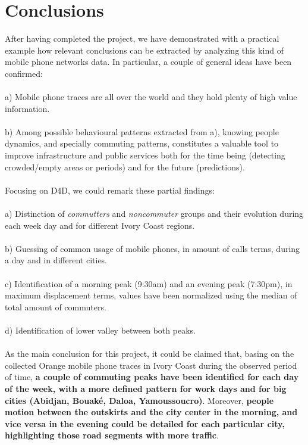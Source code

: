 \newpage
\section{Conclusions}

After having completed the project, we have demonstrated with a practical example how relevant conclusions can be extracted by analyzing this kind of mobile phone networks data. In particular, a couple of general ideas have been confirmed:
\\
\\
a) Mobile phone traces are all over the world and they hold plenty of high value information.
\\
\\
b) Among possible behavioural patterns extracted from a), knowing people dynamics, and specially commuting patterns, constitutes a valuable tool to improve infrastructure and public services both for the time being (detecting crowded/empty areas or periods) and for the future (predictions).
\\
\\
Focusing on D4D, we could remark these partial findings:
\\
\\
a) Distinction of {\it commutters} and {\it noncommuter} groups and their evolution during each week day and for different Ivory Coast regions.
\\
\\
b) Guessing of common usage of mobile phones, in amount of calls terms, during a day and in different cities.
\\
\\
c) Identification of a morning peak (9:30am) and an evening peak (7:30pm), in maximum displacement terms, values have been normalized using the median of total amount of commuters.
\\
\\
d) Identification of lower valley between both peaks.
\\
\\
As the main conclusion for this project, it could be claimed that, basing on the collected Orange mobile phone traces in Ivory Coast during the observed period of time, {\bf a couple of commuting peaks have been identified for each day of the week, with a more defined pattern for work days and for big cities (Abidjan, Bouaké, Daloa, Yamoussoucro)}. Moreover, {\bf people motion between the outskirts and the city center in the morning, and vice versa in the evening could be detailed for each particular city, highlighting those road segments with more traffic}.
